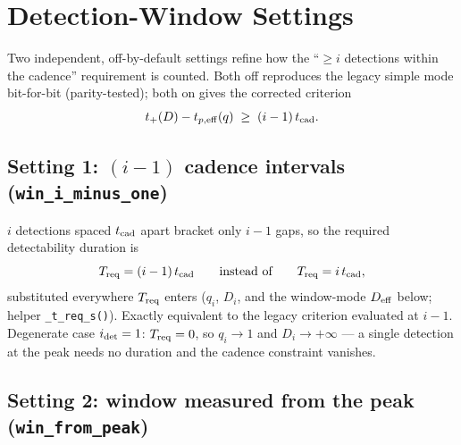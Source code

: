 \documentclass[11pt,a4paper]{article}
\begin{document}
\section{Detection-Window Settings}
\label{sec:window_settings}

Two independent, off-by-default settings refine how the ``$\ge i$ detections within the cadence'' requirement is counted. Both off reproduces the legacy simple mode bit-for-bit (parity-tested); both on gives the corrected criterion
\begin{equation}
\label{eq:window_corrected}
t_{+}(D)-t_{p,\rm eff}(q)\;\ge\;(i-1)\,t_{\rm cad}.
\end{equation}

\subsection{Setting 1: $(i-1)$ cadence intervals (\texttt{win\_i\_minus\_one})}

$i$ detections spaced $t_{\rm cad}$ apart bracket only $i-1$ gaps, so the required detectability duration is
\[
T_{\rm req}=(i-1)\,t_{\rm cad}
\qquad\text{instead of}\qquad
T_{\rm req}=i\,t_{\rm cad},
\]
substituted everywhere $T_{\rm req}$ enters ($q_i$, $D_i$, and the window-mode $D_{\rm eff}$ below; helper \texttt{\_t\_req\_s()}). Exactly equivalent to the legacy criterion evaluated at $i-1$. Degenerate case $i_{\rm det}=1$: $T_{\rm req}=0$, so $q_i\to1$ and $D_i\to+\infty$ --- a single detection at the peak needs no duration and the cadence constraint vanishes.

\subsection{Setting 2: window measured from the peak (\texttt{win\_from\_peak})}
\end{document}
